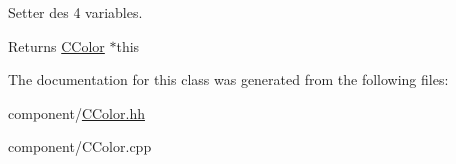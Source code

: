 Setter des 4 variables. 

\begin{DoxyReturn}{Returns}
\hyperlink{class_c_color}{C\+Color} $\ast$this 
\end{DoxyReturn}


The documentation for this class was generated from the following files\+:\begin{DoxyCompactItemize}
\item 
component/\hyperlink{_c_color_8hh}{C\+Color.\+hh}\item 
component/C\+Color.\+cpp\end{DoxyCompactItemize}
